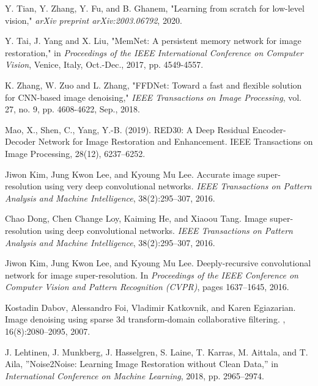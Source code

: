 \documentclass[a4paper,
               ]{jacow}
\begin{document}
	{
	\begin{thebibliography}{9} %
	
        Y. Tian, Y. Zhang, Y. Fu, and B. Ghanem, "Learning from scratch for low-level vision," \textit{arXiv preprint arXiv:2003.06792}, 2020.

	
        Y. Tai, J. Yang and X. Liu, "MemNet: A persistent memory network for image restoration," in \emph{Proceedings of the IEEE International Conference on Computer Vision}, Venice, Italy, Oct.-Dec., 2017, pp. 4549-4557.

        K. Zhang, W. Zuo and L. Zhang, "FFDNet: Toward a fast and flexible solution for CNN-based image denoising," \emph{IEEE Transactions on Image Processing}, vol. 27, no. 9, pp. 4608-4622, Sep., 2018.


        Mao, X., Shen, C.,   Yang, Y.-B. (2019). RED30: A Deep Residual Encoder-Decoder Network for Image Restoration and Enhancement. IEEE Transactions on Image Processing, 28(12), 6237–6252.

        Jiwon Kim, Jung Kwon Lee, and Kyoung Mu Lee.
        Accurate image super-resolution using very deep convolutional networks.
        {\em IEEE Transactions on Pattern Analysis and Machine Intelligence}, 38(2):295--307, 2016.

        Chao Dong, Chen Change Loy, Kaiming He, and Xiaoou Tang.
        Image super-resolution using deep convolutional networks.
        {\em IEEE Transactions on Pattern Analysis and Machine Intelligence}, 38(2):295--307, 2016.

        Jiwon Kim, Jung Kwon Lee, and Kyoung Mu Lee.
        \newblock Deeply-recursive convolutional network for image super-resolution.
        \newblock In {\em Proceedings of the IEEE Conference on Computer Vision and Pattern Recognition (CVPR)}, pages 1637--1645, 2016.
	
        Kostadin Dabov, Alessandro Foi, Vladimir Katkovnik, and Karen Egiazarian.
        \newblock Image denoising using sparse 3d transform-domain collaborative filtering.
        , 16(8):2080--2095, 2007.

        J. Lehtinen, J. Munkberg, J. Hasselgren, S. Laine, T. Karras, M. Aittala, and T. Aila,
        ''Noise2Noise: Learning Image Restoration without Clean Data,''
        in \emph{International Conference on Machine Learning}, 2018, pp. 2965--2974.


\end{thebibliography}}
\end{document}
